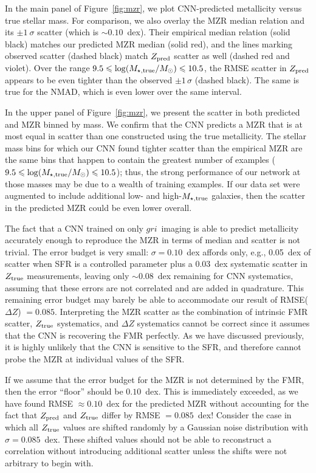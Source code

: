 \documentclass[fleqn,usenatbib]{mnras}
\newcommand{\sdssg}{\hbox{$g$}}
\newcommand{\sdssr}{\hbox{$r$}}
\newcommand{\sdssi}{\hbox{$i$}}
\newcommand{\msol}{\hbox{$M_\odot$}}
\newcommand{\eg}{e.g.}
\begin{document}
In the main panel of Figure~\ref{fig:mzr}, we plot CNN-predicted metallicity versus true stellar mass. For comparison, we also overlay the \cite{Tremonti2004} MZR median relation and its $\pm 1~\sigma$ scatter (which is $\sim 0.10$~dex). Their empirical median relation (solid black) matches our predicted MZR median (solid red), and the lines marking observed scatter (dashed black) match $Z_{\rm pred}$ scatter as well (dashed red and violet). Over the range $9.5 \leq \log (M_{\star, \rm true}/\msol) \leq 10.5$, the RMSE scatter in $Z_{\rm pred}$ appears to be even tighter than the observed $\pm 1\,\sigma$ (dashed black). The same is true for the NMAD, which is even lower over the same interval.

In the upper panel of Figure~\ref{fig:mzr}, we present the scatter in both predicted and \cite{Tremonti2004} MZR binned by mass. We confirm that the CNN predicts a MZR that is at most equal in scatter than one constructed using the true metallicity. The stellar mass bins for which our CNN found tighter scatter than the empirical MZR are the same bins that happen to contain the greatest number of examples ($9.5 \leq \log (M_{\star, \rm true}/\msol) \leq 10.5$); thus, the strong performance of our network at those masses may be due to a wealth of training examples. If our data set were augmented to include additional low- and high-$M_{\rm \star,true}$ galaxies, then the scatter in the predicted MZR could be even lower overall.

The fact that a CNN trained on only \sdssg\sdssr\sdssi\ imaging is able to predict metallicity accurately enough to reproduce the MZR in terms of median and scatter is not trivial. The error budget is very small: $\sigma = 0.10$~dex affords only, \eg, 0.05~dex of scatter when SFR is a controlled parameter plus a 0.03~dex systematic scatter in $Z_{\rm true}$ measurements, leaving only $\sim 0.08$~dex remaining for CNN systematics, assuming that these errors are not correlated and are added in quadrature. This remaining error budget may barely be able to accommodate our result of RMSE($\Delta Z$) $= 0.085$.
Interpreting the MZR scatter as the combination of intrinsic FMR scatter, $Z_{\rm true}$ systematics, and $\Delta Z$ systematics cannot be correct since it assumes that the CNN is recovering the FMR perfectly.
As we have discussed previously, it is highly unlikely that the CNN is sensitive to the SFR, and therefore cannot probe the MZR at individual values of the SFR.

If we assume that the error budget for the MZR is not determined by the FMR, then the error ``floor'' should be $0.10$~dex.
This is immediately exceeded, as we have found RMSE $\approx 0.10$~dex for the predicted MZR without accounting for the fact that $Z_{\rm pred}$ and $Z_{\rm true}$ differ by RMSE $= 0.085$~dex!
Consider the case in which all $Z_{\rm true}$ values are shifted randomly by a Gaussian noise distribution with $\sigma = 0.085$~dex.
These shifted values should not be able to reconstruct a correlation without introducing additional scatter unless the shifts were not arbitrary to begin with.
\end{document}

